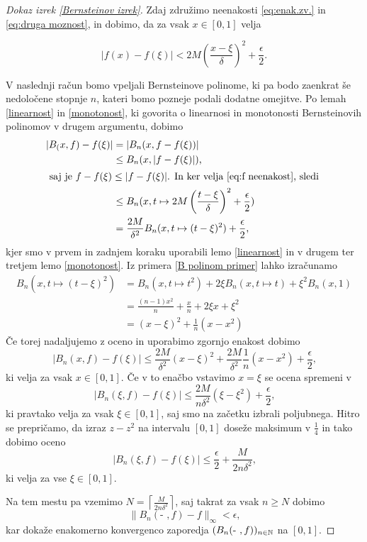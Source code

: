 \documentclass[a4paper, reqno]{amsart}
\theoremstyle{theorem}
\theoremstyle{definition}
\begin{document}
\begin{proof}[Dokaz \emph{izrek \ref{Bernsteinov izrek}}]
Zdaj združimo neenakosti \eqref{eq:enak.zv.} in \eqref{eq:druga moznost},
in dobimo, da za vsak $x \in [0,1]$ velja

\begin{equation}
	\label{eq:f neenakost}
	|f(x) - f(\xi)| < 2M\left( \frac{x - \xi}{\delta}\right)^2 + \frac{\epsilon}{2}\text{.}
\end{equation}

V naslednji račun bomo vpeljali Bernsteinove polinome, ki pa bodo zaenkrat še
nedoločene stopnje $n$, kateri bomo pozneje podali dodatne omejitve. Po lemah 
\ref{linearnost} in \ref{monotonost}, ki govorita o linearnosi in monotonosti 
Bernsteinovih polinomov v drugem argumentu, dobimo
\begin{align*}
	|B_(x, f) - f(\xi)| &= |B_n(x, f - f(\xi))|\\
	&\leq B_n(x, |f - f(\xi)|)\text{,}\\
\intertext{
		saj je $f - f(\xi) \leq |f - f(\xi)|$. In ker velja \eqref{eq:f neenakost}, sledi
}
	&\leq B_n(x, t \mapsto 2M\left(\frac{t - \xi}{\delta} \right)^2 + \frac{\epsilon}{2})\\
	&= \frac{2M}{\delta^2}B_n(x, t \mapsto (t - \xi)^2) + \frac{\epsilon}{2}\text{,}
\end{align*}
kjer smo v prvem in zadnjem koraku uporabili lemo \ref{linearnost} in v drugem ter
tretjem lemo \ref{monotonost}. Iz primera \ref{B polinom primer} lahko izračunamo
\begin{align*}
	B_n(x, t \mapsto (t - \xi)^2) &= 
	B_n(x, t \mapsto t^2) + 2\xi B_n(x, t \mapsto t) + \xi^2B_n(x, 1) \\
	&= \frac{(n - 1)x^2}{n} + \frac xn + 2\xi x + \xi^2 \\
	&= (x - \xi)^2 + \frac{1}{n}(x - x^2)
\end{align*}
Če torej nadaljujemo z oceno in uporabimo zgornjo enakost dobimo
$$
|B_n(x, f) - f(\xi)| \leq \frac{2M}{\delta^2}(x - \xi)^2 + 
\frac{2M}{\delta^2}\frac{1}{n}(x - x^2) + \frac{\epsilon}{2}\text{,}
$$
ki velja za vsak $x \in [0,1]$. Če v to enačbo vstavimo $x = \xi$ se ocena spremeni v
$$
|B_n(\xi, f) - f(\xi)| \leq  \frac{2M}{n\delta^2}(\xi - \xi^2) + \frac{\epsilon}{2}\text{,}
$$
ki pravtako velja za vsak $\xi \in [0,1]$, saj smo na začetku izbrali poljubnega. Hitro
se prepričamo, da izraz $z - z^2$ na intervalu $[0,1]$ doseže maksimum v $\frac{1}{4}$
in tako dobimo oceno
$$
|B_n(\xi, f) - f(\xi)| \leq \frac{\epsilon}{2} + \frac{M}{2n\delta^2}\text{,}
$$ 
ki velja za vse $\xi \in [0,1]$.

\par
Na tem mestu pa vzemimo $N = \left \lceil{\frac{M}{2n\delta^2}}\right \rceil$, saj
takrat za vsak $n \geq N$ dobimo
$$
\|B_n(\text{- }, f) - f\|_{\infty} < \epsilon\text{,}
$$
kar dokaže enakomerno konvergenco zaporedja $(B_n(\text{- },f))_{n \in \mathbb{N}}$ na $[0,1]$.
\end{proof}
\end{document}
